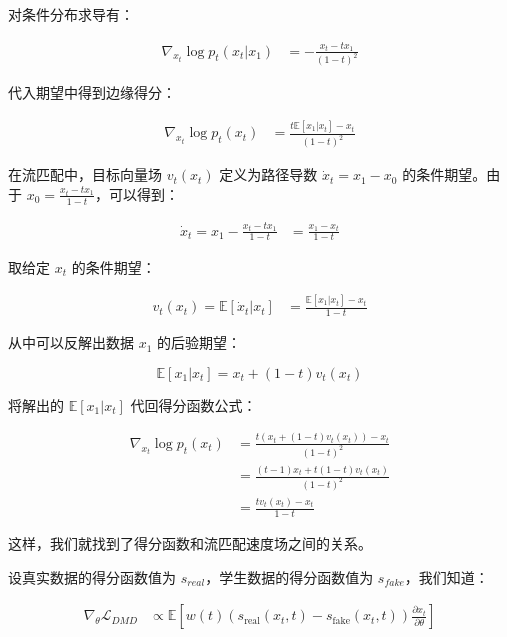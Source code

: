对条件分布求导有：

\[
\begin{aligned}
\nabla_{x_t}\log p_t(x_t|x_1)
&= -\frac{x_t-tx_1}{(1-t)^2}
\end{aligned}
\]

代入期望中得到边缘得分：

\[
\begin{aligned}
\nabla_{x_t}\log p_t(x_t)
&=
\frac{t\mathbb{E}[x_1|x_t]-x_t}{(1-t)^2}
\end{aligned}
\]

在流匹配中，目标向量场 \(v_t(x_t)\) 定义为路径导数 \(\dot{x}_t=x_1-x_0\) 的条件期望。由于 \(x_0=\frac{x_t-tx_1}{1-t}\)，可以得到：

\[
\begin{aligned}
\dot{x}_t=x_1-\frac{x_t-tx_1}{1-t}
&=
\frac{x_1-x_t}{1-t}
\end{aligned}
\]

取给定 \(x_t\) 的条件期望：

\[
\begin{aligned}
v_t(x_t)=\mathbb{E}[\dot{x}_t|x_t]
&=
\frac{\mathbb{E}[x_1|x_t]-x_t}{1-t}
\end{aligned}
\]

从中可以反解出数据 \(x_1\) 的后验期望：

\[
\mathbb{E}[x_1|x_t]=x_t+(1-t)v_t(x_t)
\]

将解出的 \(\mathbb{E}[x_1|x_t]\) 代回得分函数公式：

\[
\begin{aligned}
\nabla_{x_t}\log p_t(x_t)
&=
\frac{t(x_t+(1-t)v_t(x_t))-x_t}{(1-t)^2}
\\
&=
\frac{(t-1)x_t+t(1-t)v_t(x_t)}{(1-t)^2}
\\
&=
\frac{t v_t(x_t)-x_t}{1-t}
\end{aligned}
\]

这样，我们就找到了得分函数和流匹配速度场之间的关系。

设真实数据的得分函数值为 \(s_{real}\)，学生数据的得分函数值为 \(s_{fake}\)，我们知道：

\[
\begin{aligned}
\nabla_\theta\mathcal{L}_{DMD}
&\propto
\mathbb{E}\left[
w(t)
\left(s_{\mathrm{real}}(x_t,t)-s_{\mathrm{fake}}(x_t,t)\right)
\frac{\partial x_t}{\partial\theta}
\right]
\end{aligned}
\]


